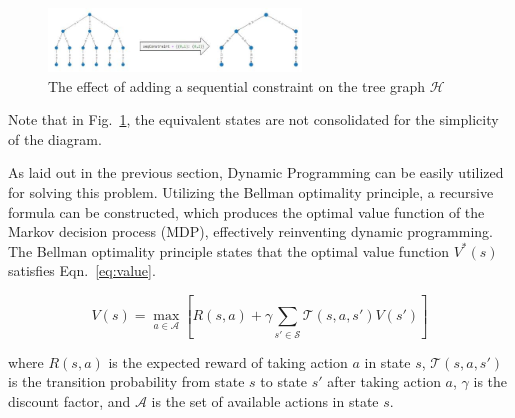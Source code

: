 \documentclass{article}
\begin{document}
\begin{figure}[!htb]
    \centering
    \includegraphics[width=0.6\textwidth]{figs/Constraint.jpg}
      \caption{The effect of adding a sequential constraint on the tree graph $\mathcal{H}$}
      \label{fig:cnstrnt}
\end{figure}

Note that in Fig.~\ref{fig:cnstrnt}, the equivalent states are not consolidated for the simplicity of the diagram.

As laid out in the previous section, Dynamic Programming can be easily utilized for solving this problem. Utilizing the Bellman optimality principle, a recursive formula can be constructed, which produces the optimal value function of the Markov decision process (MDP), effectively reinventing dynamic programming. The Bellman optimality principle states that the optimal value function $V^*(s)$ satisfies Eqn.~\ref{eq:value}.

\begin{equation} \label{eq:value}
    V(s) = \max_{a \in \mathcal{A}} \left[R(s,a) + \gamma \sum_{s' \in \mathcal{S}} \mathcal{T}(s,a,s') V(s')\right]
\end{equation}

where $R(s,a)$ is the expected reward of taking action $a$ in state $s$, $\mathcal{T}(s,a,s')$ is the transition probability from state $s$ to state $s'$ after taking action $a$, $\gamma$ is the discount factor, and $\mathcal{A}$ is the set of available actions in state $s$.
\end{document}
